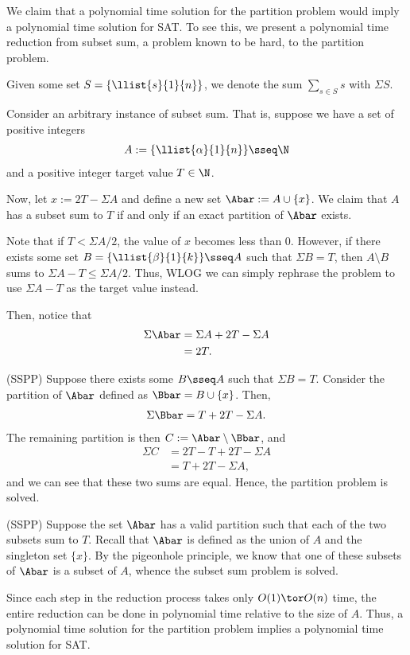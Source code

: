 \documentclass{article}
\begin{document}
\begin{solution}
We claim that a polynomial time solution for the partition problem would imply a polynomial time solution for SAT.
To see this, we present a polynomial time reduction from subset sum, a problem known to be hard, to the partition problem.

\begin{notation}
Given some set $ S = \{\llist{s}{1}{n}\}$, we denote the sum $ \sum\limits_{s\in S}s $ with  $  \Sigma S $.
\end{notation}

Consider an arbitrary instance of subset sum.
That is, suppose we have a set of positive integers \begin{align*}
  A := \{\llist{\alpha}{1}{n}\} \sseq \N
\end{align*}
and a positive integer target value $ T\in \N $.

Now, let $ x := 2T-\Sigma A $ and define a new set $ \Abar := A\cup \{x\}$.
We claim that $A$ has a subset sum to $T$ if and only if an exact partition of $\Abar$ exists.

Note that if $ T < \Sigma A/{2} $, the value of $ x $ becomes less than 0.
However, if there exists some set $ B = \{\llist{\beta}{1}{k}\}\sseq A $ such that $ \Sigma B = T $, then $ A\setminus B $ sums to $ \Sigma A - T \leq \Sigma A/{2} $.
Thus, WLOG we can simply rephrase the problem to use $ \Sigma A - T$ as the target value instead.

Then, notice that \begin{align*}
  \Sigma \Abar &= \Sigma A + 2T-\Sigma A \\
  &= 2T.
\end{align*}
\begin{subproof}[Correctness.] (SS\imp PP)
  Suppose there exists some $ B\sseq A $ such that $ \Sigma B = T $.
  Consider the partition of $ \Abar $ defined as $ \Bbar = B\cup \{x\} $.
  Then, \begin{align*}
    \Sigma \Bbar= T + 2T-\Sigma A.
  \end{align*}
  The remaining partition is then $ C := \Abar\setminus \Bbar $, and \begin{align*}
  \Sigma C &= 2T- T + 2T-\Sigma A \\
  &= T + 2T-\Sigma A,
  \end{align*}
  and we can see that these two sums are equal.
  Hence, the partition problem is solved.

  (SS\pmi PP)
  Suppose the set $ \Abar $ has a valid partition such that each of the two subsets sum to $ T $.
  Recall that $ \Abar $ is defined as the union of $ A $ and the singleton set $ \{x\} $.
  By the pigeonhole principle, we know that one of these subsets of $ \Abar $ is a subset of $ A $, whence the subset sum problem is solved.
\end{subproof}
Since each step in the reduction process takes only $ O(1)\tor O(n) $ time, the entire reduction can be done in polynomial time relative to the size of $ A $.
Thus, a polynomial time solution for the partition problem implies a polynomial time solution for SAT.
\end{solution}
\end{document}
